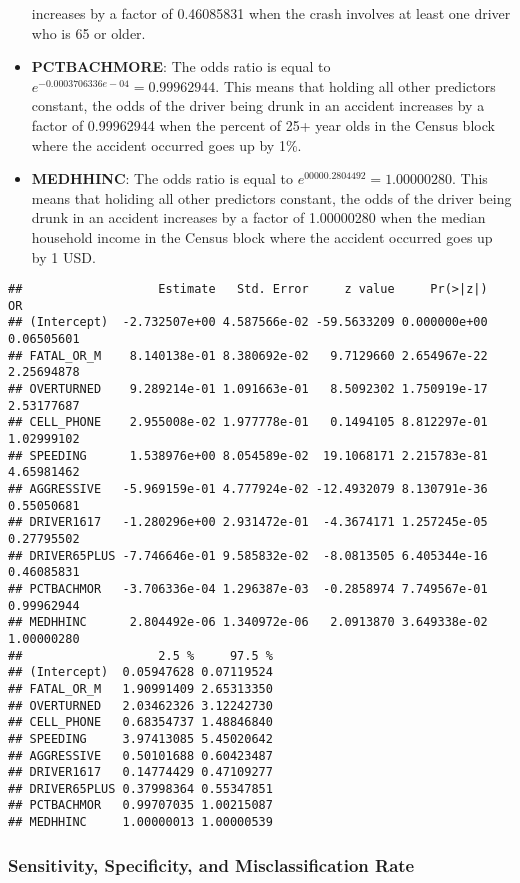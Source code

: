 \documentclass[
]{article}
\begin{document}
\begin{itemize}
  increases by a factor of 0.46085831 when the crash involves at least
  one driver who is 65 or older.
\item
  \textbf{PCTBACHMORE}: The odds ratio is equal to
  \(e^{-0.0003706336e-04} = 0.99962944\). This means that holding all
  other predictors constant, the odds of the driver being drunk in an
  accident increases by a factor of 0.99962944 when the percent of 25+
  year olds in the Census block where the accident occurred goes up by
  1\%.
\item
  \textbf{MEDHHINC}: The odds ratio is equal to
  \(e^{00000.2804492} = 1.00000280\). This means that holiding all other
  predictors constant, the odds of the driver being drunk in an accident
  increases by a factor of 1.00000280 when the median household income
  in the Census block where the accident occurred goes up by 1 USD.
\end{itemize}

\begin{verbatim}
##                   Estimate   Std. Error     z value     Pr(>|z|)         OR
## (Intercept)  -2.732507e+00 4.587566e-02 -59.5633209 0.000000e+00 0.06505601
## FATAL_OR_M    8.140138e-01 8.380692e-02   9.7129660 2.654967e-22 2.25694878
## OVERTURNED    9.289214e-01 1.091663e-01   8.5092302 1.750919e-17 2.53177687
## CELL_PHONE    2.955008e-02 1.977778e-01   0.1494105 8.812297e-01 1.02999102
## SPEEDING      1.538976e+00 8.054589e-02  19.1068171 2.215783e-81 4.65981462
## AGGRESSIVE   -5.969159e-01 4.777924e-02 -12.4932079 8.130791e-36 0.55050681
## DRIVER1617   -1.280296e+00 2.931472e-01  -4.3674171 1.257245e-05 0.27795502
## DRIVER65PLUS -7.746646e-01 9.585832e-02  -8.0813505 6.405344e-16 0.46085831
## PCTBACHMOR   -3.706336e-04 1.296387e-03  -0.2858974 7.749567e-01 0.99962944
## MEDHHINC      2.804492e-06 1.340972e-06   2.0913870 3.649338e-02 1.00000280
##                   2.5 %     97.5 %
## (Intercept)  0.05947628 0.07119524
## FATAL_OR_M   1.90991409 2.65313350
## OVERTURNED   2.03462326 3.12242730
## CELL_PHONE   0.68354737 1.48846840
## SPEEDING     3.97413085 5.45020642
## AGGRESSIVE   0.50101688 0.60423487
## DRIVER1617   0.14774429 0.47109277
## DRIVER65PLUS 0.37998364 0.55347851
## PCTBACHMOR   0.99707035 1.00215087
## MEDHHINC     1.00000013 1.00000539
\end{verbatim}

\hypertarget{sensitivity-specificity-and-misclassification-rate}{%
\subsubsection{Sensitivity, Specificity, and Misclassification
Rate}\label{sensitivity-specificity-and-misclassification-rate}}
\end{document}
